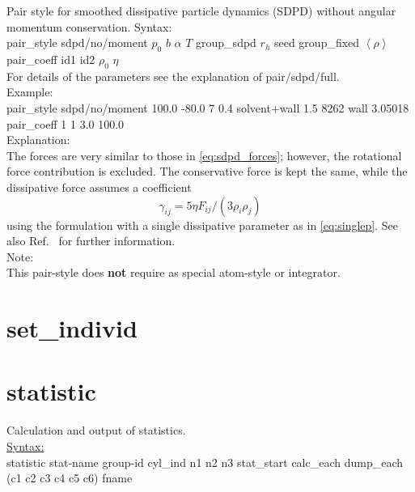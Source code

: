 Pair style for smoothed dissipative particle dynamics (SDPD) without angular momentum conservation.
Syntax:
\\[1ex]
pair\_style      sdpd/no/moment $p_0$ $b$ $\alpha$ $T$ group\_sdpd $r_h$ seed group\_fixed $\left< \rho \right>$
\\[1ex]
pair\_coeff      id1 id2 $\rho_0$ $\eta$\\[2ex]
For details of the parameters see the explanation of pair/sdpd/full.\\[2ex]
Example:
\\[0.5ex]
pair\_style      sdpd/no/moment 100.0 -80.0 7 0.4 solvent+wall 1.5 8262 wall 3.05018
\\[1ex]
pair\_coeff      1 1 3.0 100.0
\\[2ex]
Explanation:\\
The forces are very similar to those in \cref{eq:sdpd_forces}; however, the rotational force contribution is excluded.
The conservative force is kept the same, while the dissipative force assumes a coefficient
\begin{equation}
 \gamma_{ij} = 5\eta F_{ij}/(3\rho_i\rho_j)
\end{equation}
using the formulation with a single dissipative parameter as in \cref{eq:singlep}. See also Ref.~\cite{Espanol_SDPD_2003} for further information.\\[2ex]
Note:\\
This pair-style does \textbf{not} require as special atom-style or integrator.

\section{set\_individ}


\section{statistic}

Calculation and output of statistics.
\\[2ex]
\underline{Syntax:}
\\[1ex]
statistic stat-name group-id cyl\_ind n1 n2 n3 stat\_start calc\_each dump\_each (c1 c2 c3 c4 c5 c6) fname


